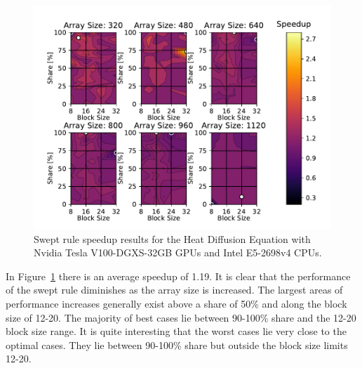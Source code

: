 \documentclass[preprints,article,accept,moreauthors,pdftex]{Definitions/mdpi}
\newcommand\fs{0.7}
\def\newCPU{Intel E5-2698v4} %
\def\newGPU{Nvidia Tesla V100-DGXS-32GB}
\begin{document}
\begin{figure}[H]
    
    \begin{center}
        \includegraphics[scale=\fs, trim={0.75cm 0.4cm 0.8cm 0.7cm},clip]{figs/speedUpheatNew.pdf}
        \caption{Swept rule speedup results for the Heat Diffusion Equation with \newGPU{} GPUs and \newCPU{} CPUs.}
        \label{fig:newSpeedupHeat}
    \end{center}
\end{figure}




In Figure~\ref{fig:newSpeedupHeat} there is an average speedup of 1.19. It is clear that the performance of the swept rule diminishes as the array size is increased. The largest areas of performance increases generally exist above a share of 50\% and along the block size of 12-20. The majority of best cases lie between 90-100\% share and the 12-20 block size range. It is quite interesting that the worst cases lie very close to the optimal cases. They lie between 90-100\% share but outside the block size limits 12-20.
\end{document}
